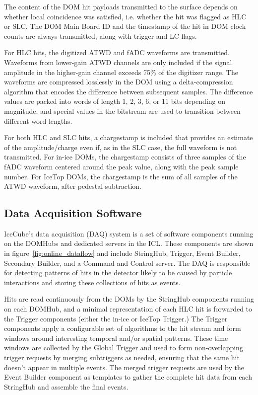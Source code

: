 The content of the DOM hit payloads transmitted to the surface depends on whether local
coincidence was satisfied, i.e. whether the hit was flagged as HLC or SLC.
The DOM Main Board ID and the timestamp of the hit in DOM clock counts are
always transmitted, along with trigger and LC flags.

For HLC hits, the digitized ATWD and fADC waveforms are transmitted.
Waveforms from lower-gain ATWD channels are only included if the signal
amplitude in the higher-gain channel exceeds 75\% of the digitizer range.  The waveforms are
compressed losslessly in the DOM using a delta-compression algorithm that
encodes the difference between subsequent samples.  The difference values
are packed into words of length 1, 2, 3, 6, or 11 bits depending on
magnitude, and special values in the bitstream are used to transition
between different word lengths.

For both HLC and SLC hits, a chargestamp is included that provides an
estimate of the amplitude/charge even if, as in the SLC case, the full
waveform is not transmitted.  For in-ice DOMs, the chargestamp consists of
three samples of the fADC waveform centered around the peak value, along
with the peak sample number.  For IceTop DOMs, the chargestamp is the sum
of all samples of the ATWD waveform, after pedestal subtraction.

\subsection{Data Acquisition Software}

IceCube's data acquisition (DAQ) system is a set of software components
running on the DOMHubs and dedicated servers in the ICL.  These components are shown in
figure~\ref{fig:online_dataflow} and include StringHub, Trigger, Event
Builder, Secondary Builder, and a Command and Control server.  The DAQ is
responsible for detecting patterns of hits in the detector likely to be
caused by particle interactions and storing these collections of hits as
events.

Hits are read continuously from the DOMs by the
StringHub components running on each DOMHub, and a minimal representation of each HLC hit is
forwarded to the Trigger components (either the in-ice or IceTop Trigger.)
The Trigger components apply a
configurable set of algorithms to the hit stream and form windows around interesting temporal
and/or spatial patterns.  These time windows are collected by the
Global Trigger and used to form non-overlapping trigger requests by merging
subtriggers as needed, ensuring that the same hit doesn't appear in
multiple events.  The merged trigger requests are used by the Event Builder
component as templates 
to gather the complete hit data from each StringHub and assemble the final
events.


